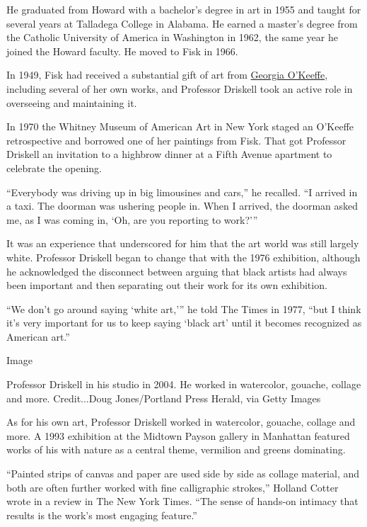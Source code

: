 He graduated from Howard with a bachelor's degree in art in 1955 and
taught for several years at Talladega College in Alabama. He earned a
master's degree from the Catholic University of America in Washington in
1962, the same year he joined the Howard faculty. He moved to Fisk in
1966.

In 1949, Fisk had received a substantial gift of art from
\href{https://www.nytimes.com/1986/03/07/obituaries/georgia-o-keeffe-dead-at-98-shaper-of-modern-art-in-us.html}{Georgia
O'Keeffe}, including several of her own works, and Professor Driskell
took an active role in overseeing and maintaining it.

In 1970 the Whitney Museum of American Art in New York staged an
O'Keeffe retrospective and borrowed one of her paintings from Fisk. That
got Professor Driskell an invitation to a highbrow dinner at a Fifth
Avenue apartment to celebrate the opening.

``Everybody was driving up in big limousines and cars,'' he recalled.
``I arrived in a taxi. The doorman was ushering people in. When I
arrived, the doorman asked me, as I was coming in, `Oh, are you
reporting to work?'''

It was an experience that underscored for him that the art world was
still largely white. Professor Driskell began to change that with the
1976 exhibition, although he acknowledged the disconnect between arguing
that black artists had always been important and then separating out
their work for its own exhibition.

``We don't go around saying `white art,''' he told The Times in 1977,
``but I think it's very important for us to keep saying `black art'
until it becomes recognized as American art.''

Image

Professor Driskell in his studio in 2004. He worked in watercolor,
gouache, collage and more. Credit...Doug Jones/Portland Press Herald,
via Getty Images

As for his own art, Professor Driskell worked in watercolor, gouache,
collage and more. A 1993 exhibition at the Midtown Payson gallery in
Manhattan featured works of his with nature as a central theme,
vermilion and greens dominating.

``Painted strips of canvas and paper are used side by side as collage
material, and both are often further worked with fine calligraphic
strokes,'' Holland Cotter wrote in a review in The New York Times. ``The
sense of hands-on intimacy that results is the work's most engaging
feature.''

